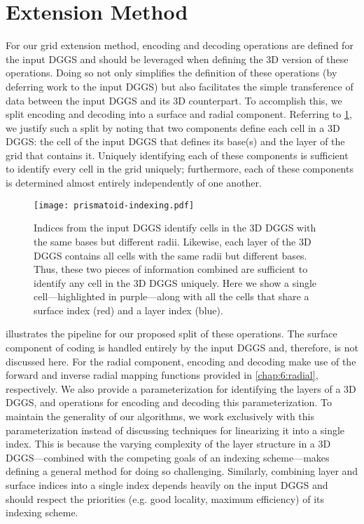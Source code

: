 \section{Extension Method} \label{chap:7:extension}
For our grid extension method, encoding and decoding operations are defined for the input DGGS and should be leveraged when defining the 3D version of these operations.
Doing so not only simplifies the definition of these operations (by deferring work to the input DGGS) but also facilitates the simple transference of data between the input DGGS and its 3D counterpart.
To accomplish this, we split encoding and decoding into a surface and radial component.
Referring to \cref{fig:prismatoid-indexing}, we justify such a split by noting that two components define each cell in a 3D DGGS: the cell of the input DGGS that defines its base(s) and the layer of the grid that contains it.
Uniquely identifying each of these components is sufficient to identify every cell in the grid uniquely; furthermore, each of these components is determined almost entirely independently of one another.


\begin{figure}[htp!]
	\centering
	\texttt{[image: prismatoid-indexing.pdf]}
	\caption[Separation of surface and layer indices for the grid extension method]{
		Indices from the input DGGS identify cells in the 3D DGGS with the same bases but different radii.
		Likewise, each layer of the 3D DGGS contains all cells with the same radii but different bases.
		Thus, these two pieces of information combined are sufficient to identify any cell in the 3D DGGS uniquely.
		Here we show a single cell---highlighted in purple---along with all the cells that share a surface index (red) and a layer index (blue).
	}
	\label{fig:prismatoid-indexing}
\end{figure}


 illustrates the pipeline for our proposed split of these operations.
The surface component of coding is handled entirely by the input DGGS and, therefore, is not discussed here.
For the radial component, encoding and decoding make use of the forward and inverse radial mapping functions provided in \cref{chap:6:radial}, respectively.
We also provide a parameterization for identifying the layers of a 3D DGGS, and operations for encoding and decoding this parameterization.
To maintain the generality of our algorithms, we work exclusively with this parameterization instead of discussing techniques for linearizing it into a single index.
This is because the varying complexity of the layer structure in a 3D DGGS---combined with the competing goals of an indexing scheme---makes defining a general method for doing so challenging.
Similarly, combining layer and surface indices into a single index depends heavily on the input DGGS and should respect the priorities (e.g. good locality, maximum efficiency) of its indexing scheme.


